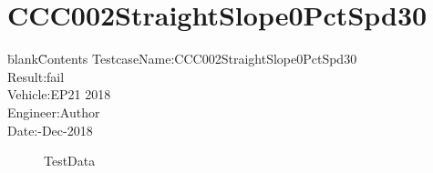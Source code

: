 \documentclass[12pt]{report}
\begin{document}
\section{CCC002StraightSlope0PctSpd30} 
\begin{CJK}{GBK}{kai} 
\begin{tabbing} 
\hspace*{40bp}\=blank\hspace*{80bp}\=Contents\kill 
 \>TestcaseName:\>CCC002StraightSlope0PctSpd30\\ 
 \>Result:\>fail\\ 
 \>Vehicle:\>EP21 2018\\ 
 \>Engineer:\>Author\\ 
 \>Date:-Dec-2018\\ 
\end{tabbing} 
\end{CJK} 
\label{w2} 
\begin{figure}[h!]  
\centering  
{} 
 
\caption{TestData} 
\end{figure} 
\newpage 
\end{document}

